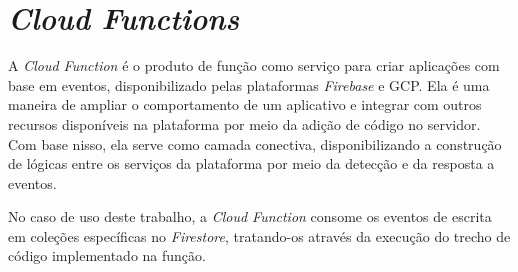 \section{\textit{Cloud Functions}}\label{sec:cloudfunctions}

A \textit{Cloud Function} é o produto de função como serviço para criar aplicações com base em eventos, disponibilizado pelas plataformas \textit{Firebase} e GCP. Ela é uma maneira de ampliar o comportamento de um aplicativo e integrar com outros recursos disponíveis na plataforma por meio da adição de código no servidor. Com base nisso, ela serve como camada conectiva, disponibilizando a construção de lógicas entre os serviços da plataforma por meio da detecção e da resposta a eventos.

No caso de uso deste trabalho, a \textit{Cloud Function} consome os eventos de escrita em coleções específicas no \textit{Firestore}, tratando-os através da execução do trecho de código implementado na função.
